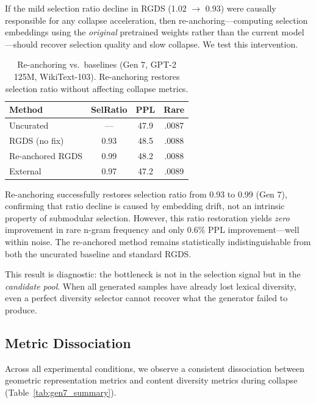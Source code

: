 \documentclass[11pt]{article}
\begin{document}
If the mild selection ratio decline in RGDS (1.02 $\to$ 0.93) were causally responsible for any collapse acceleration, then re-anchoring---computing selection embeddings using the \emph{original} pretrained weights rather than the current model---should recover selection quality and slow collapse. We test this intervention.

\begin{table}[h]
\centering
\caption{Re-anchoring vs.\ baselines (Gen 7, GPT-2 125M, WikiText-103). Re-anchoring restores selection ratio without affecting collapse metrics.}
\label{tab:reanchor}
\small
\begin{tabular}{l ccc}
\toprule
\textbf{Method} & \textbf{SelRatio} & \textbf{PPL} & \textbf{Rare} \\
\midrule
Uncurated         & ---  & 47.9 & .0087 \\
RGDS (no fix)     & 0.93 & 48.5 & .0088 \\
Re-anchored RGDS  & 0.99 & 48.2 & .0088 \\
External          & 0.97 & 47.2 & .0089 \\
\bottomrule
\end{tabular}
\end{table}

Re-anchoring successfully restores selection ratio from 0.93 to 0.99 (Gen 7), confirming that ratio decline is caused by embedding drift, not an intrinsic property of submodular selection. However, this ratio restoration yields \emph{zero} improvement in rare n-gram frequency and only 0.6\% PPL improvement---well within noise. The re-anchored method remains statistically indistinguishable from both the uncurated baseline and standard RGDS.

This result is diagnostic: the bottleneck is not in the selection signal but in the \emph{candidate pool}. When all generated samples have already lost lexical diversity, even a perfect diversity selector cannot recover what the generator failed to produce.

\subsection{Metric Dissociation}
\label{sec:dissociation}

Across all experimental conditions, we observe a consistent dissociation between geometric representation metrics and content diversity metrics during collapse (Table~\ref{tab:gen7_summary}).
\end{document}
